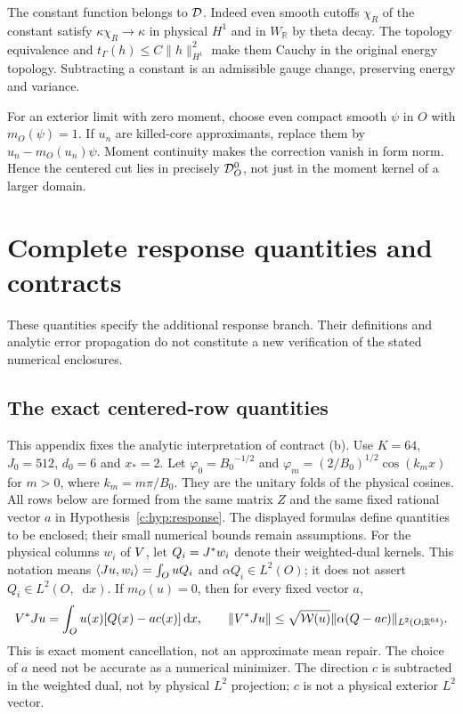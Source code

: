 \documentclass[11pt,a4paper]{article}
\numberwithin{equation}{section}
\theoremstyle{definition}\newtheorem{definition}[theorem]{Definition}
\theoremstyle{remark}\newtheorem{remark}[theorem]{Remark}
\newcommand{\R}{\mathbb R}\newcommand{\C}{\mathbb C}\newcommand{\N}{\mathbb N}
\newcommand{\ip}[2]{\langle#1,#2\rangle}\newcommand{\norm}[1]{\lVert#1\rVert}\newcommand{\abs}[1]{\lvert#1\rvert}
\newcommand{\dd}{\mathop{}\!\mathrm d}\newcommand{\one}{\mathbf1}
\begin{document}
The constant function belongs to $\mathcal D$. Indeed even smooth cutoffs
$\chi_R$ of the constant satisfy $\kappa\chi_R\to\kappa$ in physical
$H^1$ and in $W_\R$ by theta decay. The topology equivalence and
$t_\Gamma(h)\le C\norm h_{H^1}^2$ make them Cauchy in the original
energy topology. Subtracting a constant is an admissible gauge change,
preserving energy and variance.

For an exterior limit with zero moment, choose even compact smooth
$\psi$ in $O$ with $m_O(\psi)=1$. If $u_n$ are killed-core approximants,
replace them by $u_n-m_O(u_n)\psi$. Moment continuity makes the
correction vanish in form norm. Hence the centered cut lies in
precisely $\mathcal D_O^0$, not just in the moment kernel of a larger domain.


\section{Complete response quantities and contracts}\label{app:response}
These quantities specify the additional response branch. Their definitions and analytic error propagation do not constitute a new verification of the stated numerical enclosures.


\subsection{The exact centered-row quantities}\label{c:app:rows}
This appendix fixes the analytic interpretation of contract (b).
Use $K=64$, $J_0=512$, $d_0=6$ and $x_*=2$.
Let $\varphi_0={B_0}^{-1/2}$ and
$\varphi_m=(2/{B_0})^{1/2}\cos(k_mx)$ for $m>0$, where $k_m=m\pi/{B_0}$.
They are the unitary folds of the physical cosines.
All rows below are formed from the same matrix $Z$ and the same fixed rational vector $a$ in Hypothesis~\ref{c:hyp:response}.
The displayed formulas define quantities to be enclosed; their small numerical bounds remain assumptions.
For the physical columns $w_i$ of $V$, let $Q_i=J^*w_i$ denote
their weighted-dual kernels. This notation means
$\ip{\J u}{w_i}=\int_OuQ_i$ and
$\alpha Q_i\in L^2(O)$; it does not assert $Q_i\in L^2(O,\dd x)$.
If $m_O(u)=0$, then for every fixed vector $a$,
\begin{equation}\label{c:eq:centering}
 \V^*\J u=\int_Ou(x)[Q(x)-ac(x)]\dd x,\qquad
 \norm{\V^*\J u}\le\sqrt{\wo(u)}\norm{\alpha(Q-ac)}_{L^2(O;\R^{64})}.
\end{equation}
This is exact moment cancellation, not an approximate mean repair.
The choice of $a$ need not be accurate as a numerical minimizer.
The direction $c$ is subtracted in the weighted dual, not by physical
$L^2$ projection; $c$ is not a physical exterior $L^2$ vector.
\end{document}
